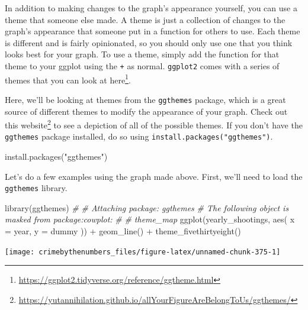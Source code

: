 \documentclass[
  a4paper,
]{krantz}
\makeatletter
\newenvironment{Shaded}{\begin{snugshade}}{\end{snugshade}}
\newcommand{\AttributeTok}[1]{\textcolor[rgb]{0.77,0.63,0.00}{#1}}
\newcommand{\CommentTok}[1]{\textcolor[rgb]{0.56,0.35,0.01}{\textit{#1}}}
\newcommand{\FunctionTok}[1]{\textcolor[rgb]{0.00,0.00,0.00}{#1}}
\newcommand{\NormalTok}[1]{#1}
\newcommand{\SpecialCharTok}[1]{\textcolor[rgb]{0.00,0.00,0.00}{#1}}
\newcommand{\StringTok}[1]{\textcolor[rgb]{0.31,0.60,0.02}{#1}}
\renewcommand{\href}[2]{#2\footnote{\url{#1}}}
\newenvironment{kframe}{%
\medskip{}
\setlength{\fboxsep}{.8em}
 \def\at@end@of@kframe{}%
 \ifinner\ifhmode%
  \def\at@end@of@kframe{\end{minipage}}%
  \begin{minipage}{\columnwidth}%
 \fi\fi%
 \def\FrameCommand##1{\hskip\@totalleftmargin \hskip-\fboxsep
 \colorbox{shadecolor}{##1}\hskip-\fboxsep
     \hskip-\linewidth \hskip-\@totalleftmargin \hskip\columnwidth}%
 \MakeFramed {\advance\hsize-\width
   \@totalleftmargin\z@ \linewidth\hsize
   \@setminipage}}%
 {\par\unskip\endMakeFramed%
 \at@end@of@kframe}
\renewenvironment{Shaded}{\begin{kframe}}{\end{kframe}}
\makeatother
\begin{document}
In addition to making changes to the graph's appearance
yourself, you can use a theme that someone else made. A
theme is just a collection of changes to the graph's
appearance that someone put in a function for others to use.
Each theme is different and is fairly opinionated, so you
should only use one that you think looks best for your
graph. To use a theme, simply add the function for that
theme to your ggplot using the \texttt{+} as normal.
\texttt{ggplot2} comes with a series of themes that you can
look at
\href{https://ggplot2.tidyverse.org/reference/ggtheme.html}{here}.

Here, we'll be looking at themes from the \texttt{ggthemes}
package, which is a great source of different themes to
modify the appearance of your graph. Check out this
\href{https://yutannihilation.github.io/allYourFigureAreBelongToUs/ggthemes/}{website}
to see a depiction of all of the possible themes. If you
don't have the \texttt{ggthemes} package installed, do so
using \texttt{install.packages("ggthemes")}.

\begin{Shaded}
\begin{Highlighting}[]
\FunctionTok{install.packages}\NormalTok{(}\StringTok{"ggthemes"}\NormalTok{)}
\end{Highlighting}
\end{Shaded}

Let's do a few examples using the graph made above. First,
we'll need to load the \texttt{ggthemes} library.

\begin{Shaded}
\begin{Highlighting}[]
\FunctionTok{library}\NormalTok{(ggthemes)}
\CommentTok{\# }
\CommentTok{\# Attaching package: \textquotesingle{}ggthemes\textquotesingle{}}
\CommentTok{\# The following object is masked from \textquotesingle{}package:cowplot\textquotesingle{}:}
\CommentTok{\# }
\CommentTok{\#     theme\_map}
\FunctionTok{ggplot}\NormalTok{(yearly\_shootings, }\FunctionTok{aes}\NormalTok{(}
  \AttributeTok{x =}\NormalTok{ year,}
  \AttributeTok{y =}\NormalTok{ dummy}
\NormalTok{)) }\SpecialCharTok{+}
  \FunctionTok{geom\_line}\NormalTok{() }\SpecialCharTok{+}
  \FunctionTok{theme\_fivethirtyeight}\NormalTok{()}
\end{Highlighting}
\end{Shaded}

\begin{center}\texttt{[image: crimebythenumbers\_files/figure-latex/unnamed-chunk-375-1]} \end{center}
\end{document}
